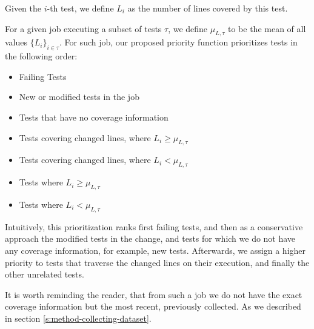 Given the $i$-th test, we define $L_i$ as the number of lines covered by this test.

For a given job executing a subset of tests $\tau$, we define $\mu_{L,\tau}$ to be the mean of
all values $\{L_i\}_{i \in \tau}$. For such job, our proposed priority function prioritizes tests
in the following order:

\begin{itemize}
    \item Failing Tests
    \item New or modified tests in the job
    \item Tests that have no coverage information
    \item Tests covering changed lines, where $L_i \ge \mu_{L,\tau}$
    \item Tests covering changed lines, where $L_i < \mu_{L,\tau}$
    \item Tests where $L_i \ge \mu_{L,\tau}$
    \item Tests where $L_i < \mu_{L,\tau}$
\end{itemize}

Intuitively, this prioritization ranks first failing tests, and then as a conservative 
approach the modified tests in the change, and tests for which we do not have any coverage 
information, for example, new tests. Afterwards, we assign a higher priority to tests that
 traverse the changed lines on their execution, and finally the other unrelated tests.

It is worth reminding the reader, that from such a job we do not have the exact coverage information
but the most recent, previously collected. As we described in section \ref{s:method-collecting-dataset}.
